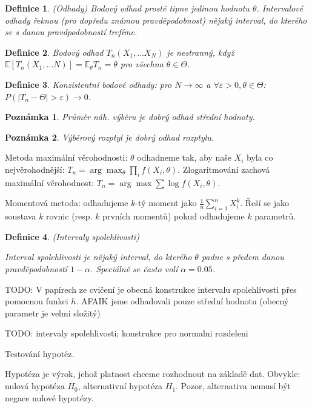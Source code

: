 \documentclass[a4paper,10pt,titlepage]{article} \usepackage[utf8]{inputenc}
\newtheorem{define}{Definice}
\newtheorem*{remark}{Poznámka}
\begin{document}
\begin{define}(Odhady)
Bodový odhad prostě tipne jedinou hodnotu $\theta$. Intervalové odhady řeknou 
(pro dopředu známou pravděpodobnost) nějaký interval, do kterého se s danou
pravdpodobností trefíme.
\end{define}

\begin{define}
Bodový odhad $T_n(X_1,\ldots X_N)$ je nestranný, když $\mathbb{E}[T_n(X_1,\ldots
N)]=\mathbb{E}_{\theta}T_n=\theta$ pro všechna $\theta\in\Theta$.
\end{define}

\begin{define}
Konzistentní bodové odhady: pro $N\rightarrow\infty$ a $\forall\varepsilon>0,
\theta\in\Theta$:
$P(|T_n-\Theta|>\varepsilon)\rightarrow 0$.
\end{define}

\begin{remark}
Průměr náh. výběru je dobrý odhad střední hodnoty.
\end{remark}

\begin{remark}
Výběrový rozptyl je dobrý odhad rozptylu.
\end{remark}

Metoda maximální věrohodnosti: $\theta$ odhadneme tak, aby naše $X_i$ byla
co nejvěrohodnější: $T_n=\arg\max_\theta \prod_{i} f(X_i,\theta)$.
Zlogaritmování zachová maximální věrohodnost: $T_n=\arg\max\sum\log
f(X_i,\theta)$.

Momentová metoda: odhadujeme $k$-tý moment jako $\frac{1}{n}\sum_{i=1}^n X_i^k$.
Řeší se jako soustava $k$ rovnic (resp. $k$ prvních momentů) pokud odhadujeme
$k$ parametrů.

\begin{define}(Intervaly spolehlivosti)

Interval spolehlivosti je nějaký interval, do kterého $\theta$ padne
s předem danou pravděpodobností $1-\alpha$. Speciálně se často volí
$\alpha=0.05$.
\end{define}

TODO: V papírech ze cvičení je obecná konstrukce intervalu spolehlivosti
přes pomocnou funkci $h$. AFAIK jsme odhadovali pouze střední hodnotu
(obecný parametr je velmi složitý)

TODO: intervaly spolehlivosti; konstrukce pro normalni rozdeleni

Testování hypotéz.

Hypotéza je výrok, jehož platnost chceme rozhodnout na základě dat.
Obvykle: nulová hypotéza $H_0$, alternativní hypotéza $H_1$. Pozor,
alternativa nemusí být negace nulové hypotézy.
\end{document}
